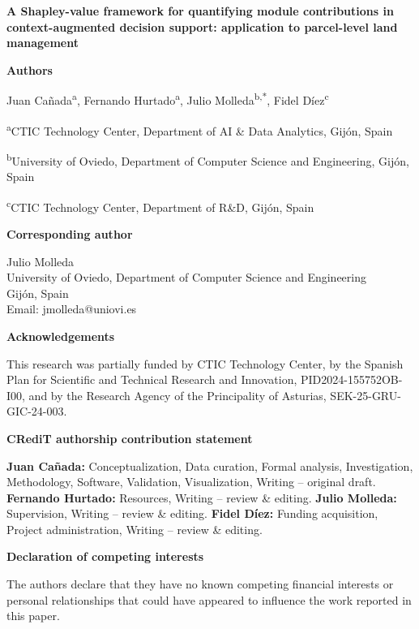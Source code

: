 \documentclass[12pt,a4paper]{article}
\begin{document}
\begin{center}
	{\Large\bfseries A Shapley-value framework for quantifying module contributions
		in context-augmented decision support: application to parcel-level
		land management\par}
\end{center}

\vspace{1em}

\textbf{Authors}

Juan Cañada\textsuperscript{a}, Fernando Hurtado\textsuperscript{a},
Julio Molleda\textsuperscript{b,*}, Fidel Díez\textsuperscript{c}

\vspace{0.5em}

\textsuperscript{a}CTIC Technology Center, Department of AI \& Data Analytics,
Gijón, Spain

\textsuperscript{b}University of Oviedo, Department of Computer Science and
Engineering, Gijón, Spain

\textsuperscript{c}CTIC Technology Center, Department of R\&D, Gijón, Spain

\vspace{1em}

\textbf{Corresponding author}

Julio Molleda\\
University of Oviedo, Department of Computer Science and Engineering\\
Gijón, Spain\\
Email: jmolleda@uniovi.es

\vspace{1em}

\textbf{Acknowledgements}

This research was partially funded by CTIC Technology Center, by the Spanish
Plan for Scientific and Technical Research and Innovation, PID2024-155752OB-I00,
and by the Research Agency of the Principality of Asturias,
SEK-25-GRU-GIC-24-003.

\vspace{1em}

\textbf{CRediT authorship contribution statement}

\textbf{Juan Cañada:} Conceptualization, Data curation, Formal analysis,
Investigation, Methodology, Software, Validation, Visualization, Writing --
original draft. \textbf{Fernando Hurtado:} Resources, Writing -- review \&
editing. \textbf{Julio Molleda:} Supervision, Writing -- review \& editing.
\textbf{Fidel Díez:} Funding acquisition, Project administration, Writing --
review \& editing.

\vspace{1em}

\textbf{Declaration of competing interests}

The authors declare that they have no known competing financial interests or
personal relationships that could have appeared to influence the work reported
in this paper.
\end{document}
